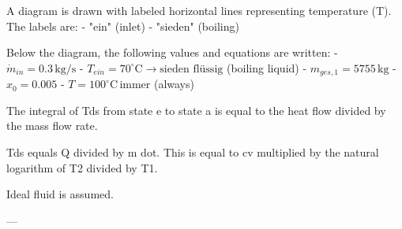 A diagram is drawn with labeled horizontal lines representing temperature (T). The labels are:  
- "ein" (inlet)  
- "sieden" (boiling)  

Below the diagram, the following values and equations are written:  
- \( \dot{m}_{in} = 0.3 \, \text{kg/s} \)  
- \( T_{ein} = 70^\circ \text{C} \rightarrow \text{sieden flüssig} \) (boiling liquid)  
- \( m_{ges,1} = 5755 \, \text{kg} \)  
- \( x_0 = 0.005 \)  
- \( T = 100^\circ \text{C} \, \text{immer} \) (always)

The integral of Tds from state e to state a is equal to the heat flow divided by the mass flow rate.  

Tds equals Q divided by m dot.  
This is equal to cv multiplied by the natural logarithm of T2 divided by T1.  

Ideal fluid is assumed.  

---